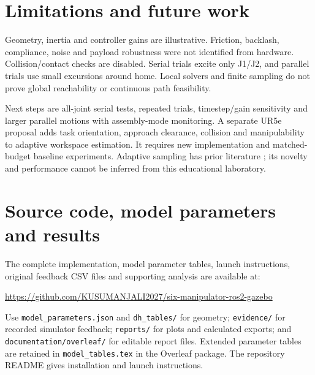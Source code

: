 \documentclass[11pt,a4paper,oneside]{report}
\begin{document}
\section{Limitations and future work}
Geometry, inertia and controller gains are illustrative. Friction, backlash, compliance, noise and payload robustness were not identified from hardware. Collision/contact checks are disabled. Serial trials excite only J1/J2, and parallel trials use small excursions around home. Local solvers and finite sampling do not prove global reachability or continuous path feasibility.

Next steps are all-joint serial tests, repeated trials, timestep/gain sensitivity and larger parallel motions with assembly-mode monitoring. A separate UR5e proposal adds task orientation, approach clearance, collision and manipulability to adaptive workspace estimation. It requires new implementation and matched-budget baseline experiments. Adaptive sampling has prior literature \cite{gaussian}; its novelty and performance cannot be inferred from this educational laboratory.

\section*{Source code, model parameters and results}
The complete implementation, model parameter tables, launch instructions, original feedback CSV files and supporting analysis are available at:
\begin{center}\url{https://github.com/KUSUMANJALI2027/six-manipulator-ros2-gazebo}\end{center}
Use \texttt{model\_parameters.json} and \texttt{dh\_tables/} for geometry; \texttt{evidence/} for recorded simulator feedback; \texttt{reports/} for plots and calculated exports; and \texttt{documentation/overleaf/} for editable report files. Extended parameter tables are retained in \texttt{model\_tables.tex} in the Overleaf package. The repository README gives installation and launch instructions.

\clearpage{}
\renewcommand{\bibname}{REFERENCES}


\end{document}

